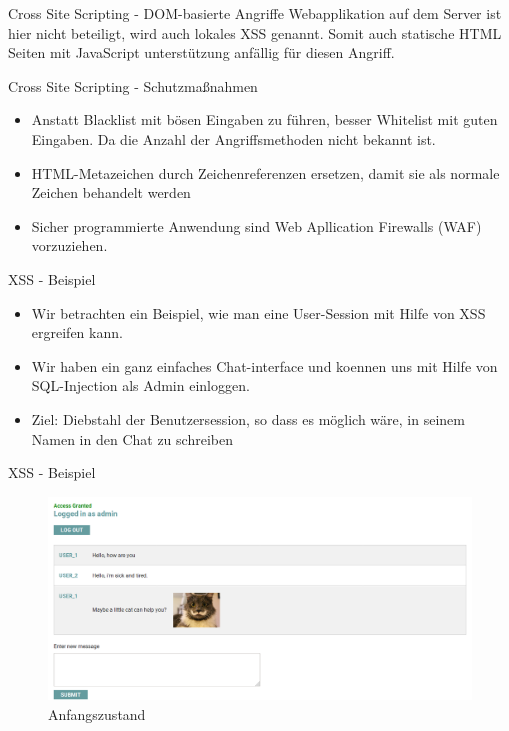 \documentclass[10pt]{beamer}
\begin{document}
\begin{frame}[fragile]{Cross Site Scripting - DOM-basierte Angriffe}
  Webapplikation auf dem Server ist hier nicht beteiligt, wird auch lokales XSS genannt.
  Somit auch statische HTML Seiten mit JavaScript unterst\"utzung anf\"allig f\"ur diesen Angriff.
\end{frame}

\begin{frame}[fragile]{Cross Site Scripting - Schutzma{\ss}nahmen}
  \begin{itemize}
    \item Anstatt Blacklist mit b\"osen Eingaben zu f\"uhren, besser Whitelist mit guten Eingaben. Da die Anzahl der Angriffsmethoden nicht bekannt ist.
    \item HTML-Metazeichen durch Zeichenreferenzen ersetzen, damit sie als normale Zeichen behandelt werden
    \item Sicher programmierte Anwendung sind Web Apllication Firewalls (WAF) vorzuziehen.
  \end{itemize}
\end{frame}

\begin{frame}[fragile]{XSS - Beispiel}
  \begin{itemize}
    \item Wir betrachten ein Beispiel, wie man eine User-Session mit Hilfe von XSS ergreifen kann.
    \item Wir haben ein ganz einfaches Chat-interface und koennen uns mit Hilfe von SQL-Injection als Admin einloggen.
    \item Ziel: Diebstahl der Benutzersession, so dass es m\"oglich w\"are, in seinem Namen in den Chat zu schreiben
  \end{itemize}
\end{frame}


\begin{frame}[fragile]{XSS - Beispiel}
  \begin{figure}[ht]
      \centering
      \includegraphics[width=\textwidth]{XSS-1.png}
      \caption{Anfangszustand}
      \label{fig:figure1}
  \end{figure}
\end{frame}
\end{document}
